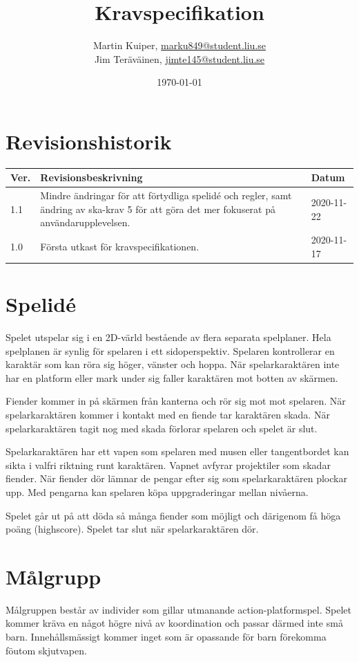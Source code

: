 \documentclass{TDP005mall}
\author{Martin Kuiper, \url{marku849@student.liu.se}\\
  Jim Teräväinen, \url{jimte145@student.liu.se}}
\title{Kravspecifikation}
\date{\today}
\begin{document}
\projectpage
\section{Revisionshistorik}
\begin{table}[!h]
\begin{tabularx}{\linewidth}{|l|X|l|}
\hline
Ver. & Revisionsbeskrivning & Datum \\\hline
1.1 & Mindre ändringar för att förtydliga spelidé och regler, samt ändring av ska-krav 5 för att göra det mer fokuserat på användarupplevelsen. & 2020-11-22 \\\hline
1.0 & Första utkast för kravspecifikationen. & 2020-11-17 \\\hline
\end{tabularx}
\end{table}


\section{Spelidé}
Spelet utspelar sig i en 2D-värld bestående av flera separata spelplaner. Hela spelplanen är synlig för spelaren i ett sidoperspektiv. Spelaren kontrollerar en karaktär som kan röra sig höger, vänster och hoppa. När spelarkaraktären inte har en platform eller mark under sig faller karaktären mot botten av skärmen.

Fiender kommer in på skärmen från kanterna och rör sig mot mot spelaren. När spelarkaraktären kommer i kontakt med en fiende tar karaktären skada. När spelarkaraktären tagit nog med skada förlorar spelaren och spelet är slut. 

Spelarkaraktären har ett vapen som spelaren med musen eller tangentbordet kan sikta i valfri riktning runt karaktären. Vapnet avfyrar projektiler som skadar fiender.
När fiender dör lämnar de pengar efter sig som spelarkaraktären plockar upp. Med pengarna kan spelaren köpa uppgraderingar mellan nivåerna. 

Spelet går ut på att döda så många fiender som möjligt och därigenom få höga poäng (highscore). Spelet tar slut när spelarkaraktären dör.


\section{Målgrupp}
Målgruppen består av individer som gillar utmanande action-platformspel. Spelet kommer kräva en något högre nivå av koordination och passar därmed inte små barn. Innehållsmässigt kommer inget som är opassande för barn förekomma föutom skjutvapen.
\end{document}
